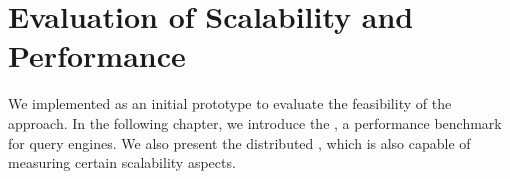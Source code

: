\chapter{Evaluation of Scalability and Performance}
\label{chap:evaluation}

We implemented \iqd{} as an initial prototype to evaluate the feasibility of the approach. In the following chapter, we introduce the \tb{}, a performance benchmark for query engines. We also present the distributed \tb{}, which is also capable of measuring certain scalability aspects.
 










